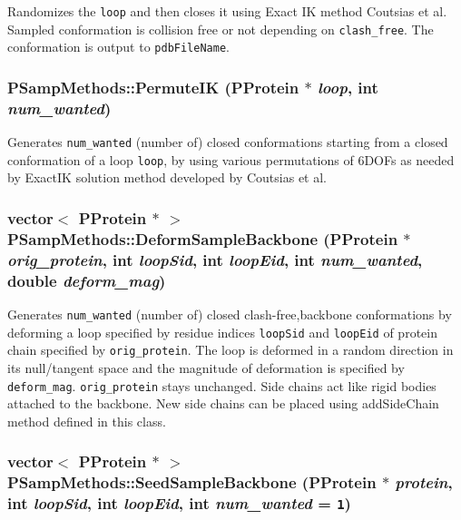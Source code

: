 Randomizes the {\tt loop} and then closes it using Exact IK method Coutsias et al. Sampled conformation is collision free or not depending on {\tt clash\_\-free}. The conformation is output to {\tt pdb\-File\-Name}. 
\subsubsection{ PSamp\-Methods::Permute\-IK ({\bf PProtein} $\ast$ {\em loop}, int {\em num\_\-wanted})\hspace{0.3cm}{\tt  [static]}}\label{classPSampMethods_4ec94f747b704b0e178a20440bd4396e}


Generates {\tt num\_\-wanted} (number of) closed conformations starting from a closed conformation of a loop {\tt loop}, by using various permutations of 6DOFs as needed by Exact\-IK solution method developed by Coutsias et al. 
\subsubsection{\setlength{\rightskip}{0pt plus 5cm}vector$<$ {\bf PProtein} $\ast$ $>$ PSamp\-Methods::Deform\-Sample\-Backbone ({\bf PProtein} $\ast$ {\em orig\_\-protein}, int {\em loop\-Sid}, int {\em loop\-Eid}, int {\em num\_\-wanted}, double {\em deform\_\-mag})\hspace{0.3cm}{\tt  [static]}}\label{classPSampMethods_76d020f9a7d1f0ca7acede28b09ecfa8}


Generates {\tt num\_\-wanted} (number of) closed clash-free,backbone conformations by deforming a loop specified by residue indices {\tt loop\-Sid} and {\tt loop\-Eid} of protein chain specified by {\tt orig\_\-protein}. The loop is deformed in a random direction in its null/tangent space and the magnitude of deformation is specified by {\tt deform\_\-mag}. {\tt orig\_\-protein} stays unchanged. Side chains act like rigid bodies attached to the backbone. New side chains can be placed using add\-Side\-Chain method defined in this class. 
\subsubsection{\setlength{\rightskip}{0pt plus 5cm}vector$<$ {\bf PProtein} $\ast$ $>$ PSamp\-Methods::Seed\-Sample\-Backbone ({\bf PProtein} $\ast$ {\em protein}, int {\em loop\-Sid}, int {\em loop\-Eid}, int {\em num\_\-wanted} = {\tt 1})\hspace{0.3cm}{\tt  [static]}}\label{classPSampMethods_1027a24a189663d4b2279cd83d2eafbf}



